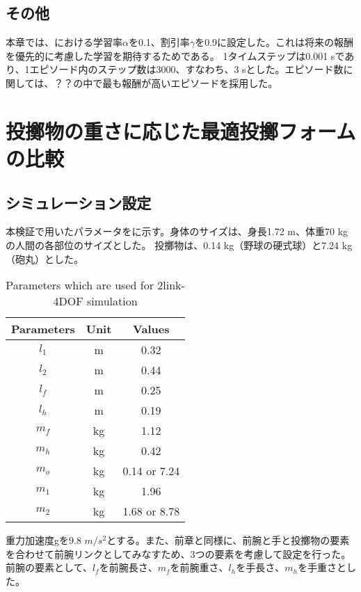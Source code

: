 \subsection{その他}
本章では、における学習率$\alpha$を0.1、割引率$\gamma$を0.9に設定した。これは将来の報酬を優先的に考慮した学習を期待するためである。
1タイムステップは0.001 sであり、1エピソード内のステップ数は3000、すなわち、3 sとした。エピソード数に関しては、？？の中で最も報酬が高いエピソードを採用した。

\section{投擲物の重さに応じた最適投擲フォームの比較}
\subsection{シミュレーション設定}
本検証で用いたパラメータをに示す。身体のサイズは、身長1.72 m、体重70 kgの人間の各部位のサイズとした。
投擲物は、0.14 kg（野球の硬式球）と7.24 kg（砲丸）とした。
\begin{table}[tb]
  \begin{center}
    \caption{Parameters which are used for 2link-4DOF simulation}

    \begin{tabular}{c|c|c}
      \hline
      Parameters & Unit & Values \\
      \hline
      $l_{1}$ & m & 0.32 \\
      $l_{2}$ & m & 0.44 \\
      $l_{f}$ & m & 0.25 \\
      $l_{h}$ & m & 0.19 \\
      $m_{f}$ & kg & 1.12 \\
      $m_{h}$ & kg & 0.42 \\
      $m_{o}$ & kg & 0.14 or 7.24 \\
      $m_{1}$ & kg & 1.96 \\
      $m_{2}$ & kg & 1.68 or 8.78 \\
      \hline
    \end{tabular}
  \end{center}
\end{table}
重力加速度gを9.8 $m/s^{2}$とする。また、前章と同様に、前腕と手と投擲物の要素を合わせて前腕リンクとしてみなすため、3つの要素を考慮して設定を行った。
前腕の要素として、$l_{f}$を前腕長さ、$m_{f}$を前腕重さ、$l_{h}$を手長さ、$m_{h}$を手重さとした。\\

